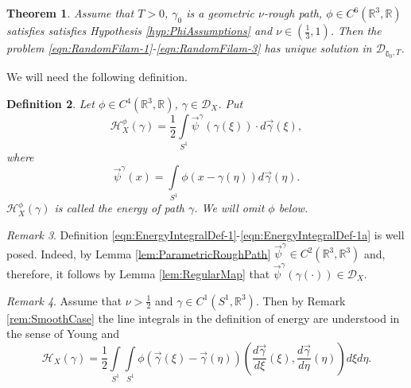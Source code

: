 \documentclass[11pt,a4paper,leqno]{amsart}%
\theoremstyle{plain}
\newtheorem{theorem}{Theorem}[section]
\theoremstyle{remark}
\newtheorem{remark}[theorem]{Remark}
\theoremstyle{plain}
\newtheorem{definition}[theorem]{Definition}
\numberwithin{equation}{section}
\def\Rnu{{\mathbb R}}
\def\intl{\int\limits}
\begin{document}
\begin{theorem}\label{thm:GlobalExistUniq}
Assume that $T>0$, $\gamma_0$ is a geometric $\nu$-rough path, $\phi\in
C^6(\Rnu^3,\Rnu)$ satisfies  satisfies Hypothesis
\ref{hyp:PhiAssumptions} and  $\nu\in(\frac{1}{3},1)$. Then the problem
\eqref{eqn:RandomFilam-1}-\eqref{eqn:RandomFilam-3} has unique
solution in $\mathcal{D}_{\mathbb{\gamma}_0,T}$.
\end{theorem}
We will need the following definition.
\begin{definition}
Let $\phi\in C^4(\Rnu^3,\Rnu)$, $\gamma\in \mathcal{D}_X$. Put
\begin{equation}
\mathcal{H}_X^{\phi}(\gamma)=\frac{1}{2}\intl_{S^1}\vec{\psi}^{\gamma}(\gamma(\xi))\cdot
d\vec{\gamma}(\xi),\label{eqn:EnergyIntegralDef-1}
\end{equation}
where
\begin{equation*}
\vec{\psi}^{\gamma}(x)=\intl_{S^1}\phi(x-\gamma(\eta))d\vec{\gamma}(\eta).\label{eqn:EnergyIntegralDef-1a}
\end{equation*}
$\mathcal{H}_X^{\phi}(\gamma)$ is called the energy of path $\gamma$. We will omit $\phi$ below.
\end{definition}
\begin{remark}\label{rem:CorrectEnergyDef}
Definition
\eqref{eqn:EnergyIntegralDef-1}-\eqref{eqn:EnergyIntegralDef-1a}
is well posed. Indeed, by Lemma \ref{lem:ParametricRoughPath}
$\vec{\psi}^{\gamma}\in C^2(\Rnu^3,\Rnu^3)$ and, therefore, it
follows by Lemma \ref{lem:RegularMap} that
$\vec{\psi}^{\gamma}(\gamma(\cdot))\in \mathcal{D}_X$.
\end{remark}
\begin{remark}
Assume that $\nu>\frac{1}{2}$ and $\gamma\in C^1(S^1,\Rnu^3)$.
Then by Remark \ref{rem:SmoothCase} the line integrals in the
definition of energy are understood in the sense of Young and
\begin{equation}
\mathcal{H}_X(\gamma)=\frac{1}{2}\intl_{S^1}\intl_{S^1}\phi(\vec{\gamma}(\xi)-\vec{\gamma}(\eta))
(\frac{d\vec{\gamma}}{d\xi}(\xi),\frac{d\vec{\gamma}}{d\eta}(\eta))d\xi
d\eta. \label{eqn:EnergyIntegralDef-2}
\end{equation}
\end{remark}
\end{document}
